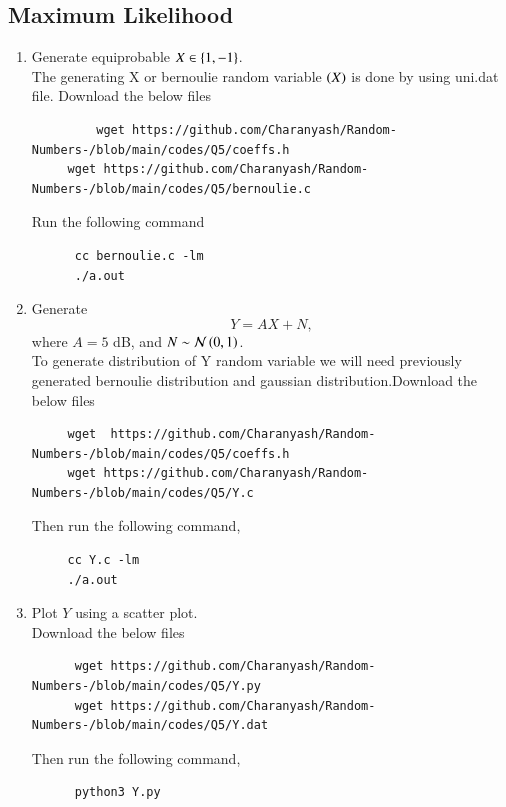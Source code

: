 \documentclass[journal,12pt,twocolumn]{IEEEtran}
\renewcommand\thesection{\arabic{section}}
\begin{document}
\begin{enumerate}[label=\thesection.\arabic*,ref=\thesection.\theenumi]
\section{Maximum Likelihood}
\begin{enumerate}[label=\thesection.\arabic*
,ref=\thesection.\theenumi]
\item Generate equiprobable $X \in \left\{1,-1\right\}$.\\	
  \solution The generating X or bernoulie random variable $ \left(X\right)$ is done by using uni.dat file. Download the below files
    \begin{lstlisting}
         wget https://github.com/Charanyash/Random-Numbers-/blob/main/codes/Q5/coeffs.h
	 wget https://github.com/Charanyash/Random-Numbers-/blob/main/codes/Q5/bernoulie.c
    \end{lstlisting}
  Run the following command
    \begin{lstlisting}
	  cc bernoulie.c -lm
	  ./a.out 
    \end{lstlisting} 
\item Generate
\begin{equation}
Y = AX+N,
\end{equation}
	where $A = 5$ dB,  and $N \sim \mathcal{N}\left(0,1\right)$.\\
  \solution To generate distribution of Y random variable we will need previously generated bernoulie distribution and gaussian distribution.Download the below files
    \begin{lstlisting}
     wget  https://github.com/Charanyash/Random-Numbers-/blob/main/codes/Q5/coeffs.h
     wget https://github.com/Charanyash/Random-Numbers-/blob/main/codes/Q5/Y.c
    \end{lstlisting}
   Then run the following command,
    \begin{lstlisting}
     cc Y.c -lm
     ./a.out
    \end{lstlisting}
\item Plot $Y$ using a scatter plot.\\
 \solution Download the below files
    \begin{lstlisting}
      wget https://github.com/Charanyash/Random-Numbers-/blob/main/codes/Q5/Y.py
      wget https://github.com/Charanyash/Random-Numbers-/blob/main/codes/Q5/Y.dat
    \end{lstlisting}
   Then run the following command,
    \begin{lstlisting}
      python3 Y.py
    \end{lstlisting}	
   	\begin{figure}

\end{figure}
\end{enumerate}
\end{enumerate}
\end{document}
